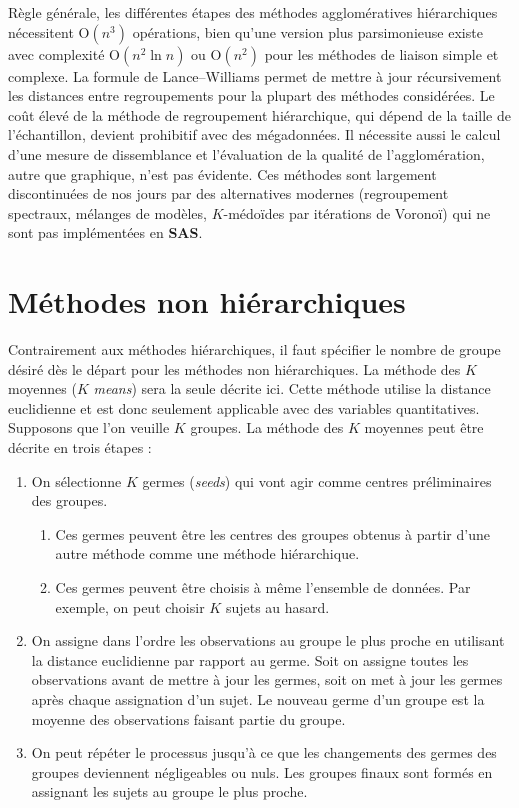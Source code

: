 \documentclass[
  11pt,
  letterpaper,
]{book}
\providecommand{\tightlist}{%
  \setlength{\itemsep}{0pt}\setlength{\parskip}{0pt}}
\theoremstyle{definition}
\theoremstyle{definition}
\theoremstyle{definition}
\theoremstyle{remark}
\begin{document}
Règle générale, les différentes étapes des méthodes agglomératives hiérarchiques nécessitent \(\mathrm{O}(n^3)\) opérations, bien qu'une version plus parsimonieuse existe avec complexité \(\mathrm{O}(n^2\ln n)\) ou \(\mathrm{O}(n^2)\) pour les méthodes de liaison simple et complexe. La formule de Lance--Williams permet de mettre à jour récursivement les distances entre regroupements pour la plupart des méthodes considérées. Le coût élevé de la méthode de regroupement hiérarchique, qui dépend de la taille de l'échantillon, devient prohibitif avec des mégadonnées. Il nécessite aussi le calcul d'une mesure de dissemblance et l'évaluation de la qualité de l'agglomération, autre que graphique, n'est pas évidente. Ces méthodes sont largement discontinuées de nos jours par des alternatives modernes (regroupement spectraux, mélanges de modèles, \(K\)-médoïdes par itérations de Voronoï) qui ne sont pas implémentées en \textbf{SAS}.

\hypertarget{muxe9thodes-non-hiuxe9rarchiques}{%
\section{Méthodes non hiérarchiques}\label{muxe9thodes-non-hiuxe9rarchiques}}

Contrairement aux méthodes hiérarchiques, il faut spécifier le nombre de groupe désiré dès le départ pour les méthodes non hiérarchiques. La méthode des \(K\) moyennes (\(K\) \emph{means}) sera la seule décrite ici. Cette méthode utilise la distance euclidienne et est donc seulement applicable avec des variables quantitatives. Supposons que l'on veuille \(K\) groupes. La méthode des \(K\) moyennes peut être décrite en trois étapes :

\begin{enumerate}
\def\labelenumi{\arabic{enumi})}
\tightlist
\item
  On sélectionne \(K\) germes (\emph{seeds}) qui vont agir comme centres préliminaires des groupes.

  \begin{enumerate}
  \def\labelenumii{\roman{enumii})}
  \tightlist
  \item
    Ces germes peuvent être les centres des groupes obtenus à partir d'une autre méthode comme une méthode hiérarchique.
  \item
    Ces germes peuvent être choisis à même l'ensemble de données. Par exemple, on peut choisir \(K\) sujets au hasard.
  \end{enumerate}
\item
  On assigne dans l'ordre les observations au groupe le plus proche en utilisant la distance euclidienne par rapport au germe. Soit on assigne toutes les observations avant de mettre à jour les germes, soit on met à jour les germes après chaque assignation d'un sujet. Le nouveau germe d'un groupe est la moyenne des observations faisant partie du groupe.
\item
  On peut répéter le processus jusqu'à ce que les changements des germes des groupes deviennent négligeables ou nuls. Les groupes finaux sont formés en assignant les sujets au groupe le plus proche.
\end{enumerate}
\end{document}
